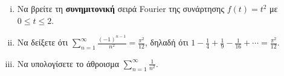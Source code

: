 \documentclass[a4paper,table]{report}
\begin{document}
\begin{mybox3}
  \begin{example}
  \item{}
  \item{}
    \begin{enumerate}[i)]
      \item Να βρείτε τη \textbf{συνημιτονική} σειρά \textlatin{Fourier} της συνάρτησης 
        $ f(t)=t^{2} $ με $ 0 \leq t \leq 2 $.
      \item Να δείξετε ότι $ \sum_{n=1}^{\infty} \frac{(-1)^{n-1}}{n^{2}} = 
        \frac{\pi ^{2}}{12} $, δηλαδή ότι $ 1 - \frac{1}{4} + \frac{1}{9} - \frac{1}{16}
        + \cdots = \frac{\pi ^{2}}{12} $.
      \item Να υπολογίσετε το άθροισμα $ \sum_{n=1}^{\infty} \frac{1}{n^{2}} $. 
    \end{enumerate}
  \end{example} 
\end{mybox3}
\end{document}
